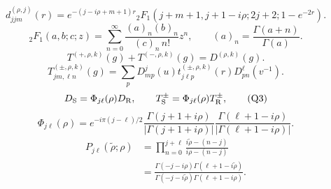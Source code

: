 \documentclass{article}
\begin{document}
\begin{equation}
\boxed{d^{(\rho,j)}_{jjm}(r)=e^{-(j-i\rho+m+1)r}{}_2F_1(j+m+1,j+1-i\rho;2j+2;1-e^{-2r}).}
\tag{M4}
\end{equation}
\begin{equation}
{}_2F_1(a,b;c;z)=\sum_{n=0}^\infty\frac{(a)_n(b)_n}{(c)_n\,n!}z^n,\qquad(a)_n=\frac{\Gamma(a+n)}{\Gamma(a)}.
\tag{M5}
\end{equation}
\begin{equation}
\boxed{T^{(+,\rho,k)}(g)+T^{(-,\rho,k)}(g)=D^{(\rho,k)}(g).}
\tag{Q1}
\end{equation}
\begin{equation}
T^{(\pm,\rho,k)}_{jm,\ell n}(g)=\sum_pD^j_{mp}(u)t^{(\pm,\rho,k)}_{j\ell p}(r)D^\ell_{pn}(v^{-1}).
\tag{Q2}
\end{equation}
\begin{equation}
D_{\rm S}=\Phi_{j\ell}(\rho)D_{\rm R},\qquad T^\pm_{\rm S}=\Phi_{j\ell}(\rho)T^\pm_{\rm R},
\tag{Q3}
\end{equation}
\begin{equation}
\Phi_{j\ell}(\rho)=e^{-i\pi(j-\ell)/2}\frac{\Gamma(j+1+i\rho)}{|\Gamma(j+1+i\rho)|}\frac{\Gamma(\ell+1-i\rho)}{|\Gamma(\ell+1-i\rho)|}.
\tag{Q4}
\end{equation}
\begin{equation}
\begin{aligned}
P_{j\ell}(\widetilde\rho;\rho)&=\prod_{n=0}^{j+\ell}\frac{i\widetilde\rho-(n-j)}{i\rho-(n-j)}\\
&=\frac{\Gamma(-j-i\rho)\Gamma(\ell+1-i\widetilde\rho)}{\Gamma(-j-i\widetilde\rho)\Gamma(\ell+1-i\rho)}.
\end{aligned}
\tag{Q5}
\end{equation}
\end{document}
